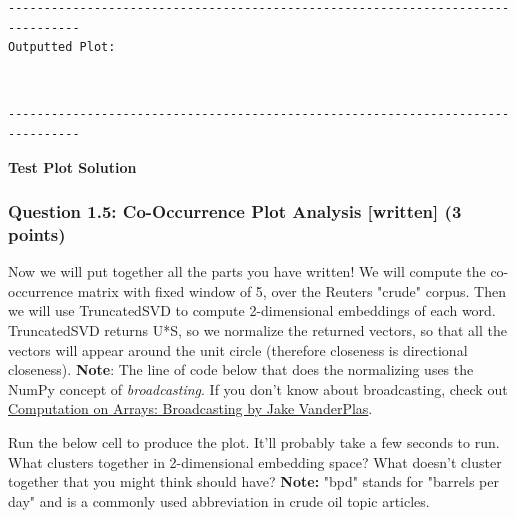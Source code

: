 \documentclass[11pt]{article}
\begin{document}
    \begin{Verbatim}[commandchars=\\\{\},fontsize=\footnotesize]
--------------------------------------------------------------------------------
Outputted Plot:

    \end{Verbatim}

    \begin{center}
    \end{center}
    { \hspace*{\fill} \\}
    
    \begin{Verbatim}[commandchars=\\\{\},fontsize=\footnotesize]
--------------------------------------------------------------------------------

    \end{Verbatim}

    \textbf{Test Plot Solution} 

    \subsubsection{Question 1.5: Co-Occurrence Plot Analysis {[}written{]}
(3
points)}\label{question-1.5-co-occurrence-plot-analysis-written-3-points}

Now we will put together all the parts you have written! We will compute
the co-occurrence matrix with fixed window of 5, over the Reuters
"crude" corpus. Then we will use TruncatedSVD to compute 2-dimensional
embeddings of each word. TruncatedSVD returns U*S, so we normalize the
returned vectors, so that all the vectors will appear around the unit
circle (therefore closeness is directional closeness). \textbf{Note}:
The line of code below that does the normalizing uses the NumPy concept
of \emph{broadcasting}. If you don't know about broadcasting, check out
\href{https://jakevdp.github.io/PythonDataScienceHandbook/02.05-computation-on-arrays-broadcasting.html}{Computation
on Arrays: Broadcasting by Jake VanderPlas}.

Run the below cell to produce the plot. It'll probably take a few
seconds to run. What clusters together in 2-dimensional embedding space?
What doesn't cluster together that you might think should have?
\textbf{Note:} "bpd" stands for "barrels per day" and is a commonly used
abbreviation in crude oil topic articles.
\end{document}
